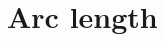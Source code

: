 \documentclass[../book/calcnotes.tex]{subfiles}
\begin{document}
\section{Arc length}
\label{sec:integral.arc-length}

\begin{exercises}
\end{exercises}
\end{document}

